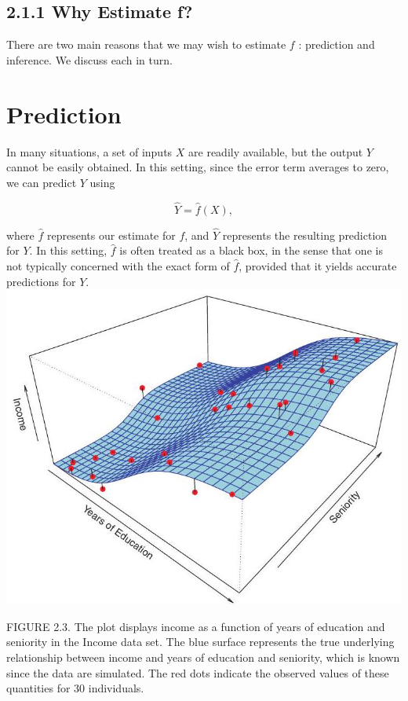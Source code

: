 \documentclass[10pt]{article}
\begin{document}
\subsection*{2.1.1 Why Estimate f?}
There are two main reasons that we may wish to estimate $f$ : prediction and inference. We discuss each in turn.

\section*{Prediction}
In many situations, a set of inputs $X$ are readily available, but the output $Y$ cannot be easily obtained. In this setting, since the error term averages to zero, we can predict $Y$ using


\begin{equation*}
\hat{Y}=\hat{f}(X), \tag{2.2}
\end{equation*}


where $\hat{f}$ represents our estimate for $f$, and $\hat{Y}$ represents the resulting prediction for $Y$. In this setting, $\hat{f}$ is often treated as a black box, in the sense that one is not typically concerned with the exact form of $\hat{f}$, provided that it yields accurate predictions for $Y$.\\
\includegraphics[max width=\textwidth, center]{2025_05_05_efe77898333945044de4g-033}

FIGURE 2.3. The plot displays income as a function of years of education and seniority in the Income data set. The blue surface represents the true underlying relationship between income and years of education and seniority, which is known since the data are simulated. The red dots indicate the observed values of these quantities for 30 individuals.
\end{document}
